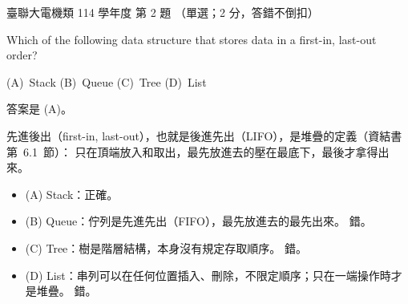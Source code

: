 \begin{pastexam}[label={px:ust-114-ee-ds-02}]{臺聯大電機類 114 學年度 第 2 題}
（單選；2 分，答錯不倒扣）

Which of the following data structure that stores data in a first-in, last-out order?

(A)~Stack \qquad (B)~Queue \qquad (C)~Tree \qquad (D)~List
\end{pastexam}

\begin{pastsoln}
答案是 (A)。

先進後出（first-in, last-out），也就是後進先出（LIFO），是堆疊的定義（資結書第~6.1~節）：
只在頂端放入和取出，最先放進去的壓在最底下，最後才拿得出來。
\begin{itemize}
\item (A) Stack：正確。
\item (B) Queue：佇列是先進先出（FIFO），最先放進去的最先出來。 錯。
\item (C) Tree：樹是階層結構，本身沒有規定存取順序。 錯。
\item (D) List：串列可以在任何位置插入、刪除，不限定順序；只在一端操作時才是堆疊。 錯。
\end{itemize}
\end{pastsoln}
